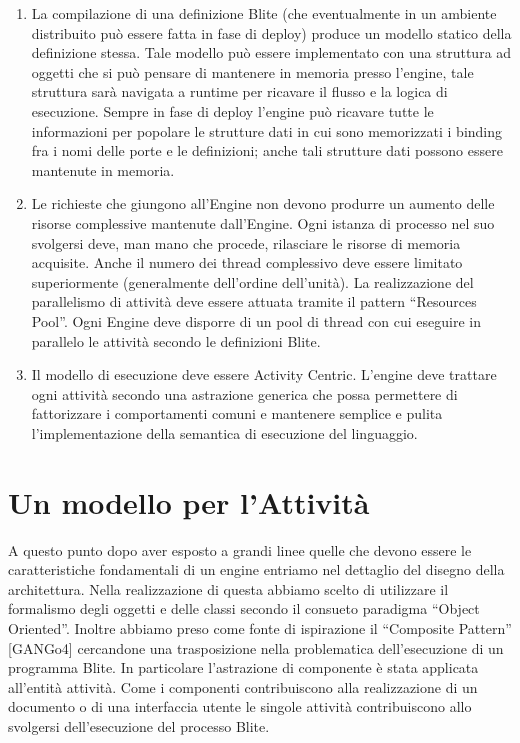 \begin{enumerate}
  \item La compilazione di una definizione Blite (che eventualmente in un
  ambiente distribuito può essere fatta in fase di deploy) produce un modello
  statico della definizione stessa. Tale modello può essere implementato con una
  struttura ad oggetti che si può pensare di mantenere in memoria presso
  l'engine, tale struttura sarà navigata a runtime per ricavare il
  flusso e la logica di esecuzione. Sempre in fase di deploy l'engine può
  ricavare tutte le informazioni per popolare le strutture dati in cui sono 
  memorizzati i binding fra i nomi delle porte e le definizioni; anche tali
  strutture dati possono essere mantenute in memoria.
  
  \item Le richieste che giungono all'Engine non devono produrre un aumento
  delle risorse complessive mantenute dall'Engine. Ogni istanza di processo nel
  suo svolgersi deve, man mano che procede, rilasciare le risorse di memoria
  acquisite. Anche il numero dei thread complessivo deve essere limitato
  superiormente (generalmente dell'ordine dell'unità). La realizzazione del
  parallelismo di attività deve essere attuata tramite il pattern ``Resources
  Pool''. Ogni Engine deve disporre di un pool di thread con cui eseguire in
  parallelo le attività secondo le definizioni Blite.
  
  \item Il modello di esecuzione deve essere Activity Centric. L'engine deve
  trattare ogni attività secondo una astrazione generica che possa permettere di
  fattorizzare i comportamenti comuni e mantenere semplice e pulita
  l'implementazione della semantica di esecuzione del linguaggio.
\end{enumerate}

\section{Un modello per l'Attività}
A questo punto dopo aver esposto a grandi linee quelle che devono essere le
caratteristiche fondamentali di un engine entriamo nel dettaglio del disegno
della architettura. Nella realizzazione di questa abbiamo scelto di utilizzare
il formalismo degli oggetti e delle classi secondo il consueto paradigma
``Object Oriented''. Inoltre abbiamo preso come fonte di
ispirazione il ``Composite Pattern'' [GANGo4] cercandone una trasposizione nella
problematica dell'esecuzione di un programma Blite. In particolare
l'astrazione di componente \`e stata applicata all'entità attività. Come i
componenti contribuiscono alla realizzazione di un documento o di una
interfaccia utente le singole attività contribuiscono allo svolgersi
dell'esecuzione del processo Blite.
 

